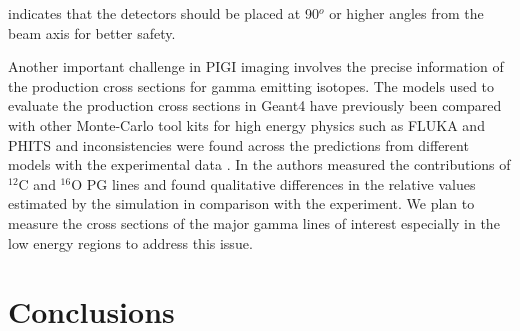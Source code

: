 \documentclass[11pt,a4paper]{article}
\begin{document}
indicates that the detectors should be placed at 90$^o$ or higher angles from the beam axis for better safety.

Another important challenge in PIGI imaging involves the precise information of the production cross sections for gamma emitting isotopes. The models used to evaluate the production cross sections in Geant4 have previously been compared with other Monte-Carlo tool kits for high energy physics such as FLUKA and PHITS and inconsistencies were found across the predictions from different models with the experimental data \cite{ProtonTotalCrosssections}. In \cite{Wronska2021} the authors measured the  contributions of $\mathrm{^{12}C}$ and $\mathrm{^{16}O}$ PG lines and found qualitative differences in the relative values estimated by the simulation in comparison with the experiment.  We plan to measure the cross sections of the major gamma lines of interest especially in the low energy regions to address this issue.










	
\section{Conclusions \label{Summary and Conclusions}} \label{section_Conclusions}
\end{document}
